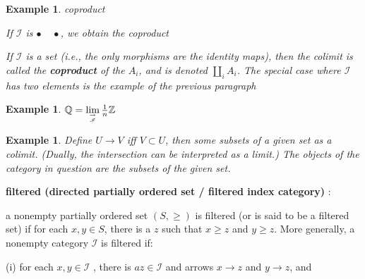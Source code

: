 \documentclass{article}
\newtheorem{example}[theorem]{Example}
\begin{document}
\begin{example}
     coproduct

     If $\mathscr I$ is\;\; $\bullet\;\;\;\;\bullet$\;\;, we obtain the coproduct
     
     If $\mathscr I$ is a set (i.e., the only morphisms are the identity maps), then the colimit is called the \textbf{coproduct} of the $A_i$, and is denoted $\coprod_i A_i$. The special case where $\mathscr I$ has two elements is the example of the previous paragraph
\end{example}
\begin{example}
$\mathbb Q=
\lim\limits_{\rightarrow\atop\mathscr I }\frac{1}{n}\mathbb Z$
\end{example}
\begin{example}
     Define $U\rightarrow V$ iff $V \subset U$, then some subsets of a given set as a colimit. (Dually, the intersection can be interpreted as a limit.) The objects of the category in question are the subsets of the given set.    
\end{example}
\textbf{filtered (directed partially ordered
set / filtered index category)} : 

a nonempty partially ordered set $(S,\geq)$ is filtered (or is said to be a filtered set) if for each $x, y \in S$, there is a $z$ such that $x \geq z$ and $y \geq z$. More generally, a nonempty category $\mathscr I$ is filtered if:

(i) for each $x, y \in \mathscr I$ , there is $a z \in \mathscr I$ and arrows $x \rightarrow z$ and $y \rightarrow z$, and
\end{document}
